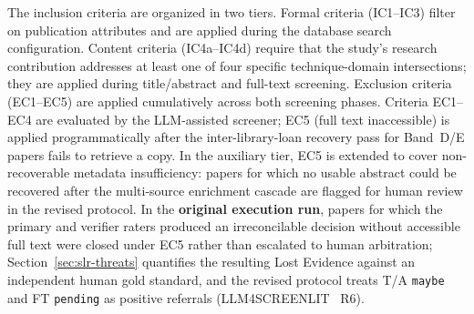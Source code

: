 The inclusion criteria are organized in two tiers. Formal criteria
(IC1--IC3) filter on publication attributes and are applied during the
database search configuration. Content criteria (IC4a--IC4d) require that the
study's research contribution addresses at least one of four specific
technique-domain intersections; they are applied during title/abstract and
full-text screening. Exclusion criteria (EC1--EC5) are applied cumulatively
across both screening phases. Criteria EC1--EC4 are evaluated by the
LLM-assisted screener; EC5 (full text inaccessible) is applied
programmatically after the inter-library-loan recovery pass for Band~D/E
papers fails to retrieve a copy. In the auxiliary tier, EC5 is extended to
cover non-recoverable metadata insufficiency: papers for which no usable
abstract could be recovered after the multi-source enrichment cascade are
flagged for human review in the revised protocol. In the \textbf{original
execution run}, papers for which the primary and verifier raters produced an
irreconcilable decision without accessible full text were closed under EC5
rather than escalated to human arbitration; Section~\ref{sec:slr-threats}
quantifies the resulting Lost Evidence against an independent human gold
standard, and the revised protocol treats T/A \texttt{maybe} and FT
\texttt{pending} as positive referrals (LLM4SCREENLIT~\cite{llm4screenlit2025}
R6).

